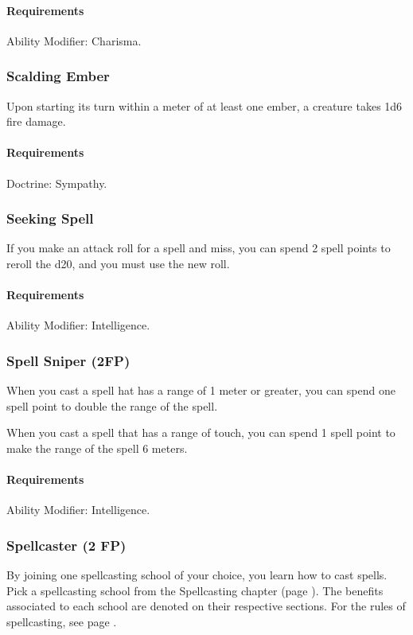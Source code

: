    \paragraph{Requirements} Ability Modifier: Charisma.
\subsubsection{Scalding Ember} \label{feat::scaldingember}
    Upon starting its turn within a meter of at least one ember, a creature takes 1d6 fire damage.
    \paragraph{Requirements} Doctrine: Sympathy.
\subsubsection{Seeking Spell} \label{feat::seekingspell}
    If you make an attack roll for a spell and miss, you can spend 2 spell points to reroll the d20, and you must use the new roll.
    \paragraph{Requirements} Ability Modifier: Intelligence.
\subsubsection{Spell Sniper (2FP)} \label{feat::spellsniper}
    When you cast a spell hat has a range of 1 meter or greater, you can spend one spell point to double the range of the spell.

    When you cast a spell that has a range of touch, you can spend 1 spell point to make the range of the spell 6 meters.
    \paragraph{Requirements} Ability Modifier: Intelligence.
\subsubsection{Spellcaster (2 FP)} \label{feat::spellcaster}
    By joining one spellcasting school of your choice, you learn how to cast spells.
    Pick a spellcasting school from the Spellcasting chapter (page \pageref{ch::spellcasting}).
    The benefits associated to each school are denoted on their respective sections.
    For the rules of spellcasting, see page \pageref{sec::spellcastingrules}.
